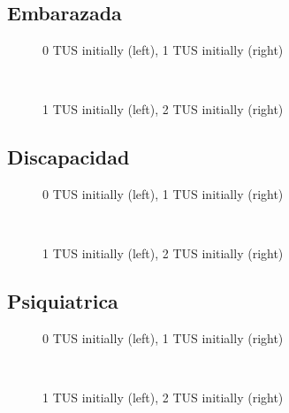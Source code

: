 \documentclass[12pt]{article}
\begin{document}
\subsection{Embarazada}
\begin{figure}[H]%
	\centering
	\caption*{0 TUS initially (left), 1 TUS initially (right)}
	 \quad 
	 \\
	
	\caption*{1 TUS initially (left), 2 TUS initially (right)}
	 \qquad
	\label{fig:embarazadaTwo}%
\end{figure}


\subsection{Discapacidad}
\begin{figure}[H]%
	\centering
	\caption*{0 TUS initially (left), 1 TUS initially (right)}
	 \quad 
	 \\
	
	\caption*{1 TUS initially (left), 2 TUS initially (right)}
	 \qquad
	\label{fig:discapacidadSiTwo}%
\end{figure}


\subsection{Psiquiatrica}
\begin{figure}[H]%
	\centering
	\caption*{0 TUS initially (left), 1 TUS initially (right)}
	 \quad 
	 \\
	
	\caption*{1 TUS initially (left), 2 TUS initially (right)}
	 \qquad
	\label{fig:psiquiatricaSiTwo}%
\end{figure}
\end{document}

